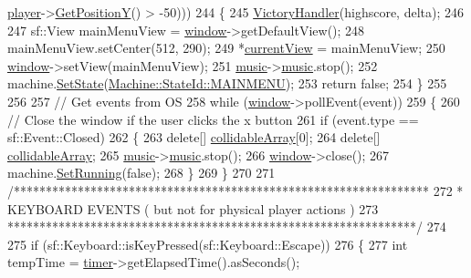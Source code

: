\begin{DoxyCode}
      \hyperlink{classTestApp_a72c21fba56a65699606328b9e765d6db}{player}->\hyperlink{classPlayerObject_ad17b9ec44299f4dc9ca20064c883496b}{GetPositionY}() > -50)))
244     \{
245         \hyperlink{classTestApp_a5de81fdea5866c4c36f23b5cdb149895}{VictoryHandler}(highscore, delta);
246 
247         sf::View mainMenuView = \hyperlink{classTestApp_a0b6b080a777092db64519ef7c4309105}{window}->getDefaultView();
248         mainMenuView.setCenter(512, 290);
249         *\hyperlink{classTestApp_ae638230755c6ce4c99ce5f0376f67302}{currentView} = mainMenuView;
250         \hyperlink{classTestApp_a0b6b080a777092db64519ef7c4309105}{window}->setView(mainMenuView);
251         \hyperlink{classTestApp_a0aab55007364bd9b7c45a914feafd166}{music}->\hyperlink{classMusic_a5b300a70ca62ec94d0e41c71bc0f9e40}{music}.stop();
252         machine.\hyperlink{classMachine_abe967397f2de76335bd90ab7aabd8f9f}{SetState}(\hyperlink{classMachine_a5fb0c119d231dd1bfe1dd2c9ca533520a3287971e79b4dca11067ed287847c1e6}{Machine::StateId::MAINMENU});
253         \textcolor{keywordflow}{return} \textcolor{keyword}{false};
254     \}
255 
256 
257     \textcolor{comment}{// Get events from OS}
258     \textcolor{keywordflow}{while} (\hyperlink{classTestApp_a0b6b080a777092db64519ef7c4309105}{window}->pollEvent(event))
259     \{
260         \textcolor{comment}{// Close the window if the user clicks the x button}
261         \textcolor{keywordflow}{if} (event.type == sf::Event::Closed)
262         \{
263             \textcolor{keyword}{delete}[] \hyperlink{classTestApp_abd825724564edeb067da3c6f2c4a5f5f}{collidableArray}[0];
264             \textcolor{keyword}{delete}[] \hyperlink{classTestApp_abd825724564edeb067da3c6f2c4a5f5f}{collidableArray};
265             \hyperlink{classTestApp_a0aab55007364bd9b7c45a914feafd166}{music}->\hyperlink{classMusic_a5b300a70ca62ec94d0e41c71bc0f9e40}{music}.stop();
266             \hyperlink{classTestApp_a0b6b080a777092db64519ef7c4309105}{window}->close();
267             machine.\hyperlink{classMachine_a5db8f7c8abac6d9ea950676917e98a80}{SetRunning}(\textcolor{keyword}{false});
268         \}
269     \}
270 
271     \textcolor{comment}{/*****************************************************************}
272 \textcolor{comment}{     *        KEYBOARD EVENTS ( but not for physical player actions )}
273 \textcolor{comment}{     ****************************************************************/}
274 
275     \textcolor{keywordflow}{if} (sf::Keyboard::isKeyPressed(sf::Keyboard::Escape))
276     \{
277         \textcolor{keywordtype}{int} tempTime = \hyperlink{classTestApp_aa0f4ce165f864c08bee05f1e5b94f295}{timer}->getElapsedTime().asSeconds();

\end{DoxyCode}
